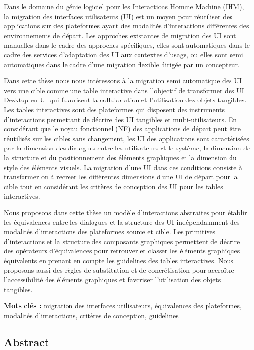 
Dans le domaine du génie logiciel pour les Interactions Homme Machine (IHM), la migration des interfaces utilisateurs (UI) est un moyen pour réutiliser des applications sur des plateformes ayant des modalités d'interactions différentes des environnements de départ. Les approches existantes de migration des UI sont manuelles dans le cadre des approches spécifiques, elles sont automatiques dans le cadre des services d'adaptation des UI aux contextes d'usage, ou elles sont semi automatiques dans le cadre d'une migration flexible dirigée par un concepteur.

Dans cette thèse nous nous intéressons à la migration semi automatique des UI vers une cible comme une table interactive dans l'objectif de transformer des UI Desktop en UI qui favorisent la collaboration et l'utilisation des objets tangibles. Les tables interactives sont des plateformes qui disposent des instruments d'interactions permettant de décrire des UI tangibles et multi-utilisateurs. En considérant que le noyau fonctionnel (NF) des applications de départ peut être réutilisés sur les cibles sans changement, les UI des applications sont caractérisées par la dimension des dialogues entre les utilisateurs et le système, la dimension de la structure et
du positionnement des éléments graphiques et la dimension du style des éléments visuels. La migration d'une UI dans ces conditions consiste à transformer ou à recréer les différentes dimensions d'une UI de départ pour la cible tout en considérant les critères de conception des UI pour les tables interactives.

Nous proposons dans cette thèse un modèle d'interactions abstraites pour établir les équivalences entre les dialogues et la structure des UI indépendamment des modalités d'interactions des plateformes source et cible. Les primitives d'interactions et la structure des composants graphiques permettent de décrire des opérateurs d'équivalences pour retrouver et classer les éléments graphiques équivalents en prenant en compte les guidelines des tables interactives. Nous proposons aussi des règles de substitution et de concrétisation pour accroître l'accessibilité des éléments graphiques et favoriser l'utilisation des objets tangibles.

\textbf{Mots clés :} migration des interfaces utilisateurs, équivalences des plateformes, modalités d'interactions,
critères de conception, guidelines

\subsection*{Abstract}

